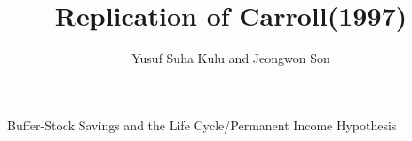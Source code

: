 \documentclass{beamer}
\title{Replication of Carroll(1997)}
\author{Yusuf Suha Kulu and Jeongwon Son}
\begin{document}
\begin{frame}[plain]
    \maketitle
    
    
\end{frame}

\begin{frame}{Buffer-Stock Savings and the Life Cycle/Permanent Income Hypothesis}
\end{frame}
\end{document}
